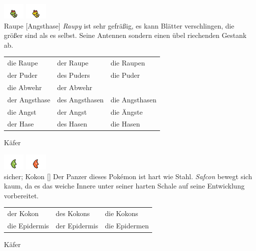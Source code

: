 \documentclass[a7paper,10pt,%
,toc
,print
]{kartei}
\begin{document}
\begin{karte}[Puderabwehr]{
\includegraphics{../regular/caterpie}
\includegraphics{../shiny/caterpie} \\
Raupe
}[Angsthase]
\emph{Raupy} ist sehr gefräßig, es kann Blätter verschlingen, die größer sind
als es selbst. Seine Antennen sondern einen übel riechenden Gestank ab.

\vspace{5pt}
\begin{tabular}{lll}
die Raupe	&	der Raupe	&	die Raupen \\
der Puder	&	des Puders	&	die Puder \\
die Abwehr	&	der Abwehr	&	 \\
der Angsthase	&	des Angsthasen	&	die Angsthasen \\
die Angst	&	der Angst	&	die Ängste \\
der Hase	&	des Hasen	&	die Hasen \\
\end{tabular}
\vspace{5pt}

Käfer
\end{karte}


\begin{karte}[Expidermis]{
\includegraphics{../regular/metapod}
\includegraphics{../shiny/metapod} \\
sicher; Kokon
}[]
Der Panzer dieses Pokémon ist hart wie Stahl. \emph{Safcon} bewegt sich kaum, da
es das weiche Innere unter seiner harten Schale auf seine Entwicklung
vorbereitet.

\vspace{5pt}
\begin{tabular}{lll}
der Kokon	&	des Kokons	&	die Kokons \\
die Epidermis	&	der Epidermis	&	die Epidermen \\
\end{tabular}
\vspace{5pt}

Käfer
\end{karte}
\end{document}
